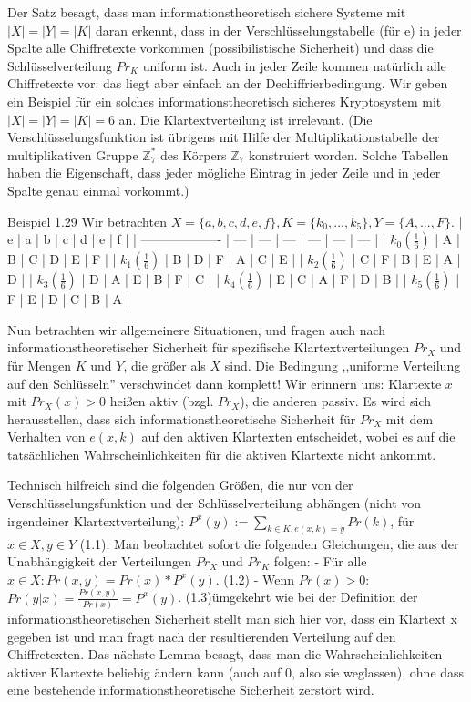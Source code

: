\documentclass[a4paper]{article}
\begin{document}
\begin{multicols}{3}
Der Satz besagt, dass man informationstheoretisch sichere Systeme mit $|X|=|Y|=|K|$ daran erkennt, dass in der Verschlüsselungstabelle (für e) in jeder Spalte alle Chiffretexte vorkommen (possibilistische Sicherheit) und dass die Schlüsselverteilung $Pr_K$ uniform ist. Auch in jeder Zeile kommen natürlich alle Chiffretexte vor: das liegt aber einfach an der Dechiffrierbedingung. 
Wir geben ein Beispiel für ein solches informationstheoretisch sicheres Kryptosystem mit $|X|=|Y|=|K|=6$ an. Die Klartextverteilung ist irrelevant. (Die Verschlüsselungsfunktion ist übrigens mit Hilfe der Multiplikationstabelle der multiplikativen Gruppe $\mathbb{Z}^*_7$ des Körpers $\mathbb{Z}_7$ konstruiert worden. Solche Tabellen haben die Eigenschaft, dass jeder mögliche Eintrag in jeder Zeile und in jeder Spalte genau einmal vorkommt.)

Beispiel 1.29 Wir betrachten $X=\{a,b,c,d,e,f\},K=\{k_0 ,...,k_5\},Y=\{A,...,F\}$.
| e                   | a   | b   | c   | d   | e   | f   |
| ------------------- | --- | --- | --- | --- | --- | --- |
| $k_0 (\frac{1}{6})$ | A   | B   | C   | D   | E   | F   |
| $k_1 (\frac{1}{6})$ | B   | D   | F   | A   | C   | E   |
| $k_2 (\frac{1}{6})$ | C   | F   | B   | E   | A   | D   |
| $k_3 (\frac{1}{6})$ | D   | A   | E   | B   | F   | C   |
| $k_4 (\frac{1}{6})$ | E   | C   | A   | F   | D   | B   |
| $k_5 (\frac{1}{6})$ | F   | E   | D   | C   | B   | A   |

Nun betrachten wir allgemeinere Situationen, und fragen auch nach informationstheoretischer Sicherheit für spezifische Klartextverteilungen $Pr_X$ und für Mengen $K$ und $Y$, die größer als $X$ sind. Die Bedingung ,,uniforme Verteilung auf den Schlüsseln'' verschwindet dann komplett! Wir erinnern uns: Klartexte $x$ mit $Pr_X(x)> 0$ heißen aktiv (bzgl. $Pr_X$), die anderen passiv. Es wird sich herausstellen, dass sich informationstheoretische Sicherheit für $Pr_X$ mit dem Verhalten von $e(x,k)$ auf den aktiven Klartexten entscheidet, wobei es auf die tatsächlichen Wahrscheinlichkeiten für die aktiven Klartexte nicht ankommt.

Technisch hilfreich sind die folgenden Größen, die nur von der Verschlüsselungsfunktion und der Schlüsselverteilung abhängen (nicht von irgendeiner Klartextverteilung): $P^x(y):=\sum_{k\in K, e(x,k)=y} Pr(k)$, für $x\in X,y\in Y$ (1.1). 
Man beobachtet sofort die folgenden Gleichungen, die aus der Unabhängigkeit der Verteilungen $Pr_X$ und $Pr_K$ folgen:
- Für alle $x\in X:Pr(x,y) = Pr(x)*P^x(y)$. (1.2)
- Wenn $Pr(x)> 0$:$Pr(y|x) = \frac{Pr(x,y)}{Pr(x)}=P^x(y)$. (1.3)ümgekehrt wie bei der Definition der informationstheoretischen Sicherheit stellt man sich hier vor, dass ein Klartext x gegeben ist und man fragt nach der resultierenden Verteilung auf den Chiffretexten.
Das nächste Lemma besagt, dass man die Wahrscheinlichkeiten aktiver Klartexte beliebig ändern kann (auch auf 0, also sie weglassen), ohne dass eine bestehende informationstheoretische Sicherheit zerstört wird.


\end{multicols}
\end{document}
